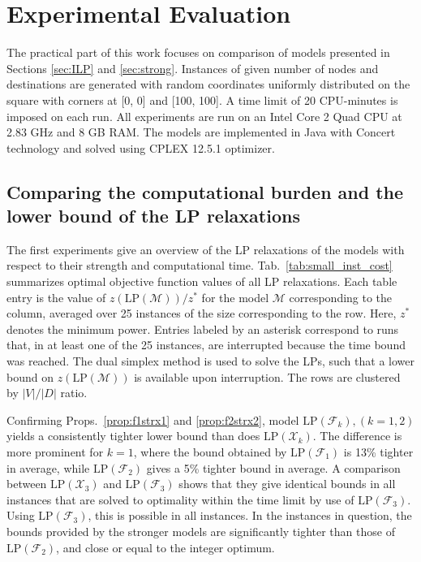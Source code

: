 \section{Experimental Evaluation}
\label{sec:exp}

The practical part of this work focuses on comparison of models presented in Sections \ref{sec:ILP} and \ref{sec:strong}.
Instances of given number of nodes and destinations are generated with random coordinates uniformly distributed on the square with corners at [0, 0] and [100, 100].
A time limit of 20 CPU-minutes is imposed on each run.
All experiments are run on an Intel Core 2 Quad CPU at 2.83 GHz and 8 GB RAM.
The models are implemented in Java with Concert technology and solved using CPLEX 12.5.1 optimizer.
 
\subsection{Comparing the computational burden and the lower bound of the LP relaxations}
\label{sec:expcomplp}

The first experiments give an overview of the LP relaxations of the models with respect to their strength and computational time. 
Tab.\ \ref{tab:small_inst_cost} summarizes optimal objective function values of all LP relaxations.
Each table entry is the value of $z(\text{LP}(\mathcal{M}))/z^*$ for the model $\mathcal{M}$ corresponding to the column,
averaged over 25 instances of the size corresponding to the row.
Here, $z^*$ denotes the minimum power.
Entries labeled by an asterisk correspond to runs that, in at least one of the 25 instances, are interrupted because the time bound was reached.
The dual simplex method is used to solve the LPs, such that a lower bound on $z(\text{LP}(\mathcal{M}))$ is available upon interruption.
The rows are clustered by $|V|/|D|$ ratio.

Confirming Props.\ \ref{prop:f1strx1} and \ref{prop:f2strx2}, model $\text{LP}(\mathcal{F}_k), (k=1,2)$ yields a consistently tighter lower bound than does $\text{LP}(\mathcal{X}_k)$. 
The difference is more prominent for $k=1$, where the bound obtained by $\text{LP}(\mathcal{F}_1)$ is 13\% tighter in average, while $\text{LP}(\mathcal{F}_2)$ gives a 5\% tighter bound in average.
A comparison between $\text{LP}(\mathcal{X}_3)$ and $\text{LP}(\mathcal{F}_3)$ shows that they give identical bounds in all instances that are solved to optimality within the time limit by use of
$\text{LP}(\mathcal{F}_3)$.
Using $\text{LP}(\mathcal{F}_3)$, this is possible in all instances.
In the instances in question, the bounds provided by the stronger models are significantly tighter than those of $\text{LP}(\mathcal{F}_2)$, and close or equal to the integer optimum.

